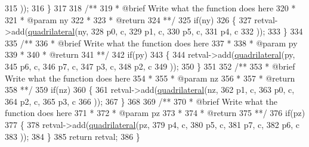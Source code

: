 \begin{DoxyCode}
315                         ));
316         \}
317 \textcolor{comment}{}
318 \textcolor{comment}{        /**}
319 \textcolor{comment}{         * @brief Write what the function does here}
320 \textcolor{comment}{         *}
321 \textcolor{comment}{         * @param ny}
322 \textcolor{comment}{         *}
323 \textcolor{comment}{         * @return}
324 \textcolor{comment}{         **/}
325         \textcolor{keywordflow}{if}(ny)
326         \{
327             retval->add(\hyperlink{namespaceGenerate_afd427e6ee5edcf5cab7d521048466496}{quadrilateral}(ny,
328                         p0, c,
329                         p1, c,
330                         p5, c,
331                         p4, c
332                         ));
333         \}
334 \textcolor{comment}{}
335 \textcolor{comment}{        /**}
336 \textcolor{comment}{         * @brief Write what the function does here}
337 \textcolor{comment}{         *}
338 \textcolor{comment}{         * @param py}
339 \textcolor{comment}{         *}
340 \textcolor{comment}{         * @return}
341 \textcolor{comment}{         **/}
342         \textcolor{keywordflow}{if}(py)
343         \{
344             retval->add(\hyperlink{namespaceGenerate_afd427e6ee5edcf5cab7d521048466496}{quadrilateral}(py,
345                         p6, c,
346                         p7, c,
347                         p3, c,
348                         p2, c
349                         ));
350         \}
351 \textcolor{comment}{}
352 \textcolor{comment}{        /**}
353 \textcolor{comment}{         * @brief Write what the function does here}
354 \textcolor{comment}{         *}
355 \textcolor{comment}{         * @param nz}
356 \textcolor{comment}{         *}
357 \textcolor{comment}{         * @return}
358 \textcolor{comment}{         **/}
359         \textcolor{keywordflow}{if}(nz)
360         \{
361             retval->add(\hyperlink{namespaceGenerate_afd427e6ee5edcf5cab7d521048466496}{quadrilateral}(nz,
362                         p1, c,
363                         p0, c,
364                         p2, c,
365                         p3, c
366                         ));
367         \}
368 \textcolor{comment}{}
369 \textcolor{comment}{        /**}
370 \textcolor{comment}{         * @brief Write what the function does here}
371 \textcolor{comment}{         *}
372 \textcolor{comment}{         * @param pz}
373 \textcolor{comment}{         *}
374 \textcolor{comment}{         * @return}
375 \textcolor{comment}{         **/}
376         \textcolor{keywordflow}{if}(pz)
377         \{
378             retval->add(\hyperlink{namespaceGenerate_afd427e6ee5edcf5cab7d521048466496}{quadrilateral}(pz,
379                         p4, c,
380                         p5, c,
381                         p7, c,
382                         p6, c
383                         ));
384         \}
385         \textcolor{keywordflow}{return} retval;
386     \}
\end{DoxyCode}
